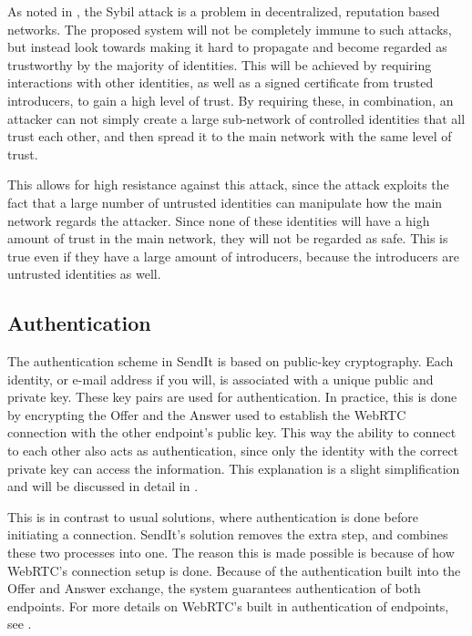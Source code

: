 		As noted in , the Sybil attack is a problem in decentralized, reputation based networks. The proposed system will not be completely immune to such attacks, but instead look towards making it hard to propagate and become regarded as trustworthy by the majority of identities. This will be achieved by requiring interactions with other identities, as well as a signed certificate from trusted introducers, to gain a high level of trust. By requiring these, in combination, an attacker can not simply create a large sub-network of controlled identities that all trust each other, and then spread it to the main network with the same level of trust.

		This allows for high resistance against this attack, since the attack exploits the fact that a large number of untrusted identities can manipulate how the main network regards the attacker. Since none of these identities will have a high amount of trust in the main network, they will not be regarded as safe. This is true even if they have a large amount of introducers, because the introducers are untrusted identities as well.

	\subsection{Authentication}

		The authentication scheme in SendIt is based on public-key cryptography. Each identity, or e-mail address if you will, is associated with a unique public and private key. These key pairs are used for authentication. In practice, this is done by encrypting the Offer and the Answer used to establish the WebRTC connection with the other endpoint's public key. This way the ability to connect to each other also acts as authentication, since only the identity with the correct private key can access the information. This explanation is a slight simplification and will be discussed in detail in .

		This is in contrast to usual solutions, where authentication is done before initiating a connection. SendIt's solution removes the extra step, and combines these two processes into one. The reason this is made possible is because of how WebRTC's connection setup is done. Because of the authentication built into the Offer and Answer exchange, the system guarantees authentication of both endpoints. For more details on WebRTC's built in authentication of endpoints, see .

